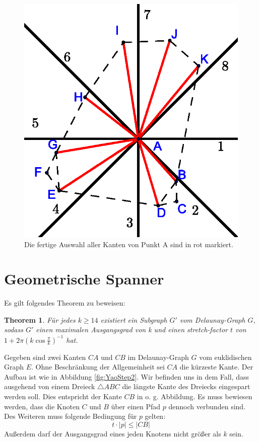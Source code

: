 \documentclass[a4paper,twoside]{IEEEtran}
\newtheorem{boundedSpannerTheorem}{Theorem}[section]
\begin{document}
\begin{figure}[h!]
\centering
\includegraphics[width=0.6\linewidth]{finished_A.eps}
\caption{Die fertige Auswahl aller Kanten von Punkt A sind in rot markiert.}
\label{fig:finished_a}
\end{figure}

\section{Geometrische Spanner}

Es gilt folgendes Theorem zu beweisen:

\begin{boundedSpannerTheorem}
Für jedes $k \geq 14 $ existiert ein Subgraph $G' $ vom Delaunay-Graph $G $, sodass $G' $ einen maximalen Ausgangsgrad von k und einen stretch-factor $t $ von $1+2\pi(k \cos{\frac{\pi}{k}})^{-1} $ hat.
\end{boundedSpannerTheorem}
Gegeben sind zwei Kanten $CA $ und $CB $ im Delaunay-Graph $G $ vom euklidischen Graph $E $.
Ohne Beschränkung der Allgemeinheit sei $CA $ die kürzeste Kante.
Der Aufbau ist wie in Abbildung \ref{fig:YaoStep2}.
Wir befinden uns in dem Fall, dass ausgehend von einem Dreieck $\triangle{ABC} $ die längste Kante des Dreiecks eingespart werden soll.
Dies entspricht der Kante $CB $ in o. g. Abbildung.
Es muss bewiesen werden, dass die Knoten $C $ und $B $ über einen Pfad $p $ dennoch verbunden sind.
Des Weiteren muss folgende Bedingung für $p $ gelten:
\begin{equation*}
 t \cdot |p| \leq	|CB| 
\end{equation*}
Außerdem darf der Ausgangsgrad eines jeden Knotens nicht größer als $k $ sein.
\end{document}
